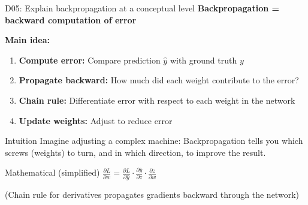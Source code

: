\documentclass[aspectratio=169, 10pt]{beamer}
\begin{document}
\begin{frame}{D05: Explain backpropagation at a conceptual level}
    \textbf{Backpropagation = backward computation of error}
    
    \vspace{0.3cm}
    \textbf{Main idea:}
    \begin{enumerate}
        \item \textbf{Compute error:} Compare prediction $\hat{y}$ with ground truth $y$
        \item \textbf{Propagate backward:} How much did each weight contribute to the error?
        \item \textbf{Chain rule:} Differentiate error with respect to each weight in the network
        \item \textbf{Update weights:} Adjust to reduce error
    \end{enumerate}
    
    \vspace{0.3cm}
    \begin{alertblock}{Intuition}
        Imagine adjusting a complex machine: Backpropagation tells you which screws (weights) to turn, and in which direction, to improve the result.
    \end{alertblock}
    
    \vspace{0.3cm}
    \begin{block}{Mathematical (simplified)}
        $\frac{\partial L}{\partial w} = \frac{\partial L}{\partial \hat{y}} \cdot \frac{\partial \hat{y}}{\partial z} \cdot \frac{\partial z}{\partial w}$
        
        \small (Chain rule for derivatives propagates gradients backward through the network)
    \end{block}
\end{frame}
\end{document}
